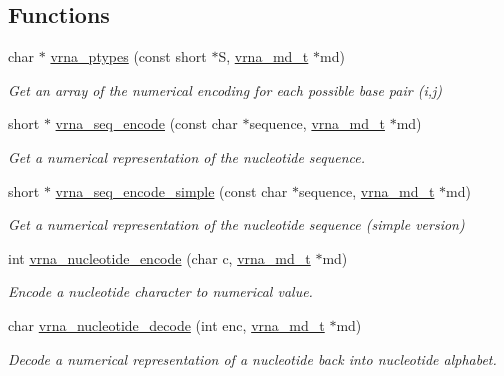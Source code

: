 \subsection*{Functions}
\begin{DoxyCompactItemize}
\item 
char $\ast$ \mbox{\hyperlink{group__alphabet__utils_ga51a9e86a5f731f5f2f5584ee67cee4a8}{vrna\+\_\+ptypes}} (const short $\ast$S, \mbox{\hyperlink{group__model__details_ga1f8a10e12a0a1915f2a4eff0b28ea17c}{vrna\+\_\+md\+\_\+t}} $\ast$md)
\begin{DoxyCompactList}\small\item\em Get an array of the numerical encoding for each possible base pair (i,j) \end{DoxyCompactList}\item 
short $\ast$ \mbox{\hyperlink{group__alphabet__utils_ga636e7d6f888fd639587296a5eddea660}{vrna\+\_\+seq\+\_\+encode}} (const char $\ast$sequence, \mbox{\hyperlink{group__model__details_ga1f8a10e12a0a1915f2a4eff0b28ea17c}{vrna\+\_\+md\+\_\+t}} $\ast$md)
\begin{DoxyCompactList}\small\item\em Get a numerical representation of the nucleotide sequence. \end{DoxyCompactList}\item 
short $\ast$ \mbox{\hyperlink{group__alphabet__utils_ga3cd79d21d53248ad2634c1c0d43e97d7}{vrna\+\_\+seq\+\_\+encode\+\_\+simple}} (const char $\ast$sequence, \mbox{\hyperlink{group__model__details_ga1f8a10e12a0a1915f2a4eff0b28ea17c}{vrna\+\_\+md\+\_\+t}} $\ast$md)
\begin{DoxyCompactList}\small\item\em Get a numerical representation of the nucleotide sequence (simple version) \end{DoxyCompactList}\item 
int \mbox{\hyperlink{group__alphabet__utils_gac12bf00123f88621c9be847b0879c1fb}{vrna\+\_\+nucleotide\+\_\+encode}} (char c, \mbox{\hyperlink{group__model__details_ga1f8a10e12a0a1915f2a4eff0b28ea17c}{vrna\+\_\+md\+\_\+t}} $\ast$md)
\begin{DoxyCompactList}\small\item\em Encode a nucleotide character to numerical value. \end{DoxyCompactList}\item 
char \mbox{\hyperlink{group__alphabet__utils_ga48ef585e697be9c8a08ed68c655e29b6}{vrna\+\_\+nucleotide\+\_\+decode}} (int enc, \mbox{\hyperlink{group__model__details_ga1f8a10e12a0a1915f2a4eff0b28ea17c}{vrna\+\_\+md\+\_\+t}} $\ast$md)
\begin{DoxyCompactList}\small\item\em Decode a numerical representation of a nucleotide back into nucleotide alphabet. \end{DoxyCompactList}\end{DoxyCompactItemize}


